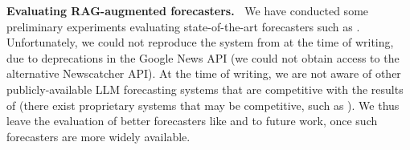 \textbf{Evaluating RAG-augmented forecasters.~}
\label{cfc:sec:cannot_evaluate_halawi}
We have conducted some preliminary experiments evaluating state-of-the-art forecasters such as \citet{halawiApproachingHumanLevelForecasting2024}.
Unfortunately, we could not reproduce the system from \citet{halawiApproachingHumanLevelForecasting2024} at the time of writing, due to deprecations in the Google News API (we could not obtain access to the alternative Newscatcher API).
At the time of writing, we are not aware of other publicly-available LLM forecasting systems that are competitive with the results of \citet{halawiApproachingHumanLevelForecasting2024}
(there exist proprietary systems that may be competitive, such as \citet{futuresearch2024}).
We thus leave the evaluation of better forecasters like \citet{halawiApproachingHumanLevelForecasting2024} and \citet{safeai2024forecasters} to future work, once such forecasters are more widely available.



